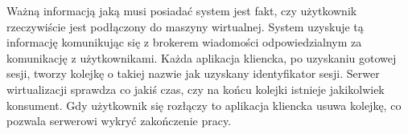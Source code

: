 \documentclass[../opis-rozwiazania.tex]{subfiles}
\begin{document}
\label{communication:user-broker}

Ważną informacją jaką musi posiadać system jest fakt, czy użytkownik rzeczywiście jest podłączony do maszyny wirtualnej.
System uzyskuje tą informację komunikując się z brokerem wiadomości odpowiedzialnym za komunikację z użytkownikami.
Każda aplikacja kliencka, po uzyskaniu gotowej sesji, tworzy kolejkę o takiej nazwie jak uzyskany identyfikator sesji.
Serwer wirtualizacji sprawdza co jakiś czas, czy na końcu kolejki istnieje jakikolwiek konsument.
Gdy użytkownik się rozłączy to aplikacja kliencka usuwa kolejkę, co pozwala serwerowi wykryć zakończenie pracy.
\end{document}
